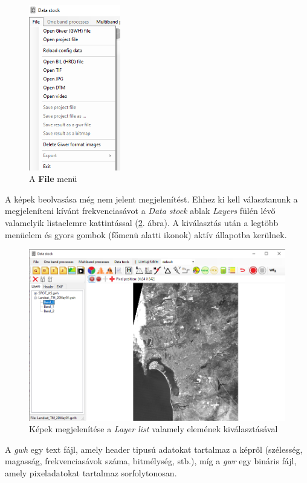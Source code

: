 \documentclass[a4paper,12pt]{article}
\begin{document}
\begin{figure}
	\centering
	\includegraphics[width=4cm]{filemenu_datastock.png}
	\caption{A \textbf{File} menü}
	\label{fig:filemenu_datastock}
\end{figure}

A képek beolvasása még nem jelent megjelenítést. Ehhez ki kell választanunk a megjeleníteni kívánt frekvenciasávot a \textit{Data stock} ablak \textit{Layers} fülén lévő valamelyik listaelemre kattintással (\ref{fig:layer_list}. ábra). A kiválasztás után a legtöbb menüelem és gyors gombok (főmenü alatti ikonok) aktív állapotba kerülnek.

\begin{figure}
	\centering
	\includegraphics[width=14cm]{layer_list.png}
	\caption{Képek megjelenítése a \textit{Layer list} valamely elemének kiválasztásával}
	\label{fig:layer_list}
\end{figure} 

A \textit{gwh} egy text fájl, amely header tipusú adatokat tartalmaz a képről (szélesség, magasság, frekvenciasávok száma, bitmélység, stb.), míg a \textit{gwr} egy bináris fájl, amely pixeladatokat tartalmaz sorfolytonosan. 
\end{document}
